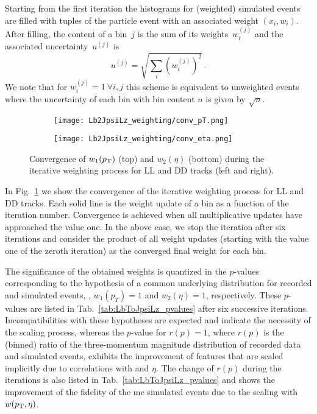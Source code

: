 Starting from the first iteration the histograms for (weighted) simulated events are filled with tuples of the particle event with an associated weight $(x_i, w_i)$.
After filling, the content of a bin~$j$ is the sum of its weights~$w^{(j)}_i$ and the associated uncertainty~$u^{(j)}$ is
\begin{equation*}
    u^{(j)} = \sqrt{ \sum_i \left( w^{(j)}_i \right)^2 } \,.
\end{equation*}
We note that for $w^{(j)}_i = 1~\forall i,j$ this scheme is equivalent to unweighted events where the uncertainty of each bin with bin content $n$ is given by $\sqrt n$.

\begin{figure}[htbp]
    \centering
    \begin{subfigure}{\textwidth}
        \centering
        \texttt{[image: Lb2JpsiLz\_weighting/conv\_pT.png]}
    \end{subfigure}
    \par\bigskip 
    \begin{subfigure}{\textwidth}
        \centering
        \texttt{[image: Lb2JpsiLz\_weighting/conv\_eta.png]}
    \end{subfigure}
    \caption{Convergence of $w_1(\mbox{$p_{\mathrm{ T}}$})$ (top) and $w_2(\eta)$ (bottom) during the iterative weighting process for \gls{LL} and \gls{DD} tracks (left and right).}
    \label{fig:LbToJpsiLz_conv}
\end{figure}

In Fig.~\ref{fig:LbToJpsiLz_conv} we show the convergence of the iterative weighting process for \gls{LL} and \gls{DD} tracks.
Each solid line is the weight update of a bin as a function of the iteration number.
Convergence is achieved when all multiplicative updates have approached the value one.
In the above case, we stop the iteration after six iterations and consider the product of all weight updates (starting with the value one of the zeroth iteration) as the converged final weight for each bin.

The significance of the obtained weights is quantized in the $p$-values corresponding to the hypothesis of a common underlying distribution for recorded and simulated events, \ie{}, $w_1(p_T)=1$ and $w_2(\eta)=1$, respectively.
These $p$-values are listed in Tab.~\ref{tab:LbToJpsiLz_pvalues} after six successive iterations.
Incompatibilities with these hypotheses are expected and indicate the necessity of the scaling process, whereas the $p$-value for $r(p)=1$, where $r(p)$ is the (binned) ratio of the three-momentum magnitude distribution of recorded data and simulated events, exhibits the improvement of features that are scaled implicitly due to correlations with \pt and $\eta$.
The change of $r(p)$ during the iterations is also listed in Tab.~\ref{tab:LbToJpsiLz_pvalues} and shows the improvement of the fidelity of the \gls{mc} simulated events due to the scaling with $w(\mbox{$p_{\mathrm{ T}}$},\eta)$.

